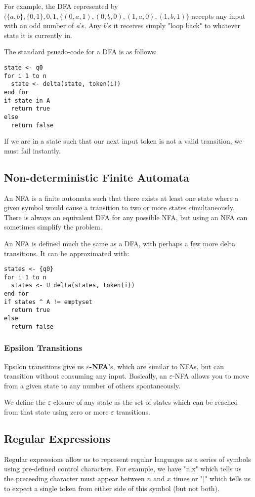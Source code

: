 \documentclass[12pt]{article}
\begin{document}
For example, the DFA represented by $(\{a,b\}, \{0,1\}, 0, 1, \{(0,a,1),(0,b,0),(1,a,0),(1,b,1)\}$ accepts any input with an odd number of {\it a}'s. Any {\it b}'s it receives simply "loop back" to whatever state it is currently in.

The standard psuedo-code for a DFA is as follows:
\begin{verbatim}
state <- q0
for i 1 to n
  state <- delta(state, token(i))
end for
if state in A
  return true
else
  return false
\end{verbatim}

If we are in a state such that our next input token is not a valid transition, we must fail instantly.

\subsection*{Non-deterministic Finite Automata}
An NFA is a finite automata such that there exists at least one state where a given symbol would cause a transition to two or more states simultaneously. There is always an equivalent DFA for any possible NFA, but using an NFA can sometimes simplify the problem.

An NFA is defined much the same as a DFA, with perhaps a few more delta transitions. It can be approximated with:
\begin{verbatim}
states <- {q0}
for i 1 to n
  states <- U delta(states, token(i))
end for
if states ^ A != emptyset
  return true
else
  return false
\end{verbatim}

\subsubsection*{Epsilon Transitions}
Epsilon transitions give us {\bf$\varepsilon$-NFA}'s, which are similar to NFAs, but can transition without consuming any input. Basically, an $\varepsilon$-NFA allows you to move from a given state to any number of others spontaneously.

We define the $\varepsilon$-closure of any state as the set of states which can be reached from that state using zero or more $\varepsilon$ transitions.

\subsection*{Regular Expressions}
Regular expressions allow us to represent regular languages as a series of symbols using pre-defined control characters. For example, we have "{n,x}" which tells us the preceeding character must appear between $n$ and $x$ times or "|" which tells us to expect a single token from either side of this symbol (but not both).
\end{document}
